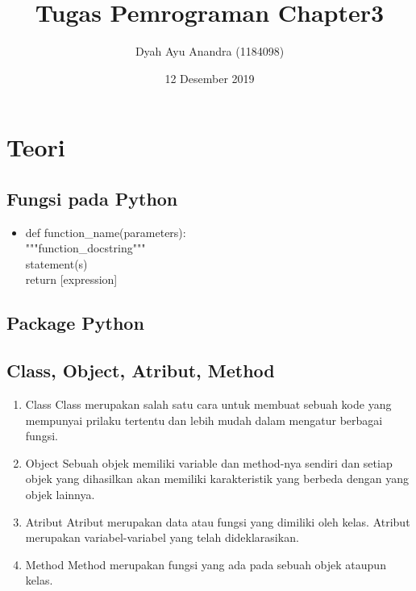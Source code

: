 \documentclass{article}
\title{Tugas Pemrograman Chapter3}
\author{Dyah Ayu Anandra (1184098)}
\date{12 Desember 2019}
\begin{document}
\maketitle

\section{Teori}
\subsection{Fungsi pada Python}
\usepackage{Fungsi merupakan bagian dari program yang  memberi statemen dan dapat digunakan ulang. Fungsi dalam Python biasanya menggunakan def sebagai kata kunci. Setelah def kemudian diikut dengan parameter yang tanda kurung dan diakhir dengan tanda titik dua (:). kemudian Baris berikutnya merupakan blok fungsi yang akan dijalankan jika fungsi dipanggil. berikut merupakan contoh sintaks yang digunakan untuk membuat fungsi:}
\begin{itemize}
    \item def function_name(parameters):\\
    """function_docstring"""\\
    statement(s)\\
    return [expression]\\
\end{itemize}

\subsection{Package Python}
\usepackage{Package merupakan sebuah folder tempat menyimpah source kode dan package juga mengelompokkan file python yang telah dibuat yang di dalamnya terdapat fungsi yang telah dibuat.}

\subsection{Class, Object, Atribut, Method}
\begin{enumerate}
    \item Class
    Class merupakan salah satu cara untuk membuat sebuah kode yang mempunyai prilaku tertentu dan lebih mudah dalam mengatur berbagai fungsi. 
    \item Object
    Sebuah objek memiliki variable dan method-nya sendiri dan setiap objek yang dihasilkan akan memiliki karakteristik yang berbeda dengan yang objek lainnya.
    \item Atribut
    Atribut  merupakan  data  atau  fungsi yang  dimiliki  oleh  kelas. Atribut merupakan variabel-variabel  yang  telah  dideklarasikan.
    \item Method
    Method merupakan fungsi yang ada pada sebuah objek ataupun kelas.
\end{enumerate}
\end{document}
